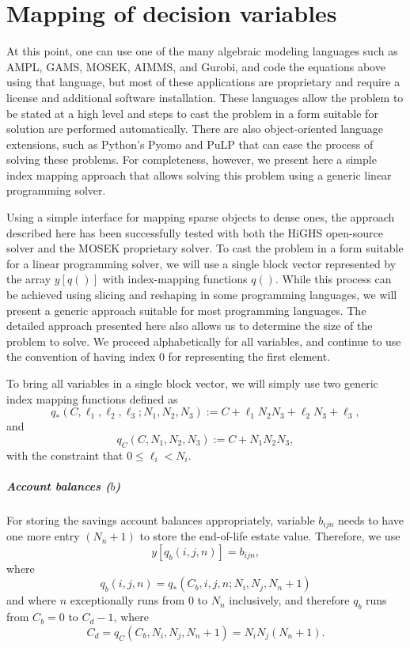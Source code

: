 \documentclass{report}[fleqn,11pt]
\begin{document}
\chapter{Mapping of decision variables}
At this point, one can use one of the many algebraic modeling languages
such as AMPL, GAMS, MOSEK, AIMMS, and Gurobi, and code the equations above
using that language, but most of these applications are
proprietary and require a license and additional software installation.
These languages allow the problem to be stated at a high level and
steps to cast the problem in a form suitable for solution are performed automatically.
There are also object-oriented language extensions, such as Python's Pyomo
and PuLP that can ease the process of solving these problems.
For completeness, however, we present here a simple
index mapping approach that allows solving this problem using a generic
linear programming solver.

Using a simple interface for mapping sparse objects to dense ones, the approach described here
has been successfully tested with both the HiGHS open-source solver
and the MOSEK proprietary solver.
To cast the problem in a form suitable for a linear programming solver, we will use
a single block vector represented by the array $y[q()]$ with index-mapping functions $q()$.
While this process can be achieved using slicing and reshaping in some programming
languages, we will present a generic approach suitable for most programming languages.
The detailed approach presented here also allows us to determine the size of the problem to solve.
We proceed alphabetically for all variables, and continue to use the convention of having
index 0 for representing the first element.

To bring all variables in a single block vector,
we will simply use two generic index mapping functions defined as
\begin{equation}
	q_*(C, \ell_1, \ell_2, \ell_3 ; N_1, N_2, N_3) :=
	C + \ell_1N_2N_3 + \ell_2N_3 + \ell_3 ,
\end{equation}
and
\begin{equation}
	q_C(C, N_1, N_2, N_3) :=
	C + N_1N_2N_3,
\end{equation}
with the constraint that $0 \le \ell_i < N_i$.

\paragraph*{Account balances (\boldmath$b$)}
For storing the savings account balances appropriately, variable $b_{ijn}$ needs to have one
more entry $(N_n + 1)$ to
store the end-of-life estate value. Therefore, we use
\begin{equation}
	y[q_b(i, j, n)] = b_{ijn},
\end{equation}
where
\begin{equation}
	\label{Eq:Extra}
	q_b(i, j, n) = q_*(C_b, i, j, n; N_i, N_j, N_n+1)
\end{equation}
and where $n$ exceptionally runs from 0 to $N_n$ inclusively, and therefore
$q_b$ runs from $C_b = 0$ to $C_{d} - 1$,
where
\[
	C_{d} = q_C(C_b, N_i, N_j, N_n+1) = N_i N_j (N_n+1).
\]
\end{document}
